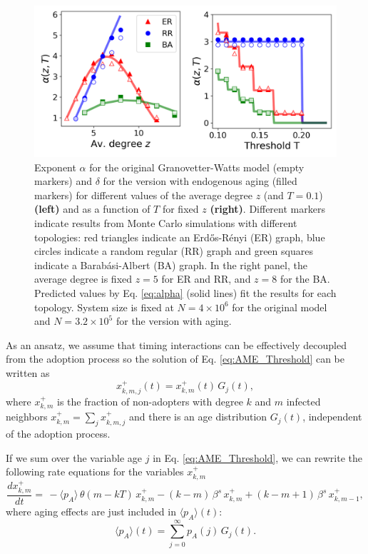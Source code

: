 \begin{figure}
    \centering \captionsetup{font=sf}
    \includegraphics[width=0.7\columnwidth]{Figs/Aging_Threshold/ENDO.pdf}
    \caption[Exponent for the Granovetter-Watts model]{\label{fig:endo_exp} Exponent $\alpha$ for the original Granovetter-Watts model (empty markers) and $\delta$ for the version with endogenous aging (filled markers) for different values of the average degree $z$ (and $T = 0.1$) \textbf{(left)} and as a function of $T$ for fixed $z$ \textbf{(right)}. Different markers indicate results from Monte Carlo simulations with different topologies: red triangles indicate an Erd\H{o}s-R\'enyi (ER) graph, blue circles indicate a random regular (RR) graph and green squares indicate a Barab\'asi-Albert (BA) graph. In the right panel, the average degree is fixed $z = 5$ for ER and RR, and $z = 8$ for the BA. Predicted values by Eq. \eqref{eq:alpha} (solid lines) fit the results for each topology. System size is fixed at $N = 4 \times 10^6$ for the original model and $N = 3.2 \times 10^5$ for the version with aging.}
\end{figure}

As an ansatz, we assume that timing interactions can be effectively decoupled from the adoption process so the solution of Eq. \eqref{eq:AME_Threshold} can be written as
\begin{equation}
    \label{eq:assumption1}
    x^{+}_{k,m,j}(t) = x^{+}_{k,m}(t) \, G_{j} (t),
\end{equation}
where $x^{+}_{k,m}$ is the fraction of non-adopters with degree $k$ and $m$ infected neighbors $x^{+}_{k,m} = \sum_{j} x^{+}_{k,m,j}$ and there is an age distribution $G_{j} (t)$, independent of the adoption process.

If we sum over the variable age $j$ in Eq. \eqref{eq:AME_Threshold}, we can rewrite the following rate equations for the variables $x^{+}_{k,m}$
\begin{equation}
    \label{eq:threshold_AME_red}
    \frac{d x^{+}_{k,m}}{dt}  = \,  - \langle p_A \rangle \, \theta(m - kT)\, x^{+}_{k,m} - (k - m) \, \beta^s \,  x^{+}_{k,m} + (k - m + 1)\, \beta^s \,  x^{+}_{k,m-1},
\end{equation}
where aging effects are  just included in $\langle p_A \rangle(t)$: 
\begin{equation}
    \langle p_A \rangle(t) = \sum_{j = 0}^{\infty} p_A(j) \, G_j (t).
\end{equation}

